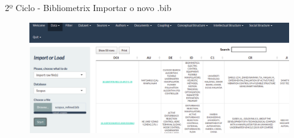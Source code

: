 \begin{frame}{2º Ciclo - Bibliometrix}
	Importar o novo .bib
  \begin{figure}[hb]
			\includegraphics[width=1\textwidth]{figures/bibliometrix/b4.png}
  \end{figure}
\end{frame}

